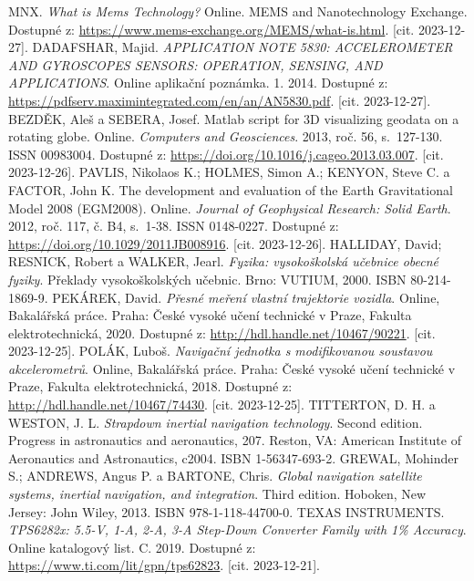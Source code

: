\begin{thebibliography}{22}

MNX. \textit{What is Mems Technology?} Online. MEMS and Nanotechnology Exchange. Dostupné z: \url{https://www.mems-exchange.org/MEMS/what-is.html}. [cit. 2023-12-27].
DADAFSHAR, Majid. \textit{APPLICATION NOTE 5830: ACCELEROMETER AND GYROSCOPES SENSORS: OPERATION, SENSING, AND APPLICATIONS}. Online aplikační poznámka. 1. 2014. Dostupné z: \url{https://pdfserv.maximintegrated.com/en/an/AN5830.pdf}. [cit. 2023-12-27].
BEZDĚK, Aleš a SEBERA, Josef. Matlab script for 3D visualizing geodata on a rotating globe. Online. \textit{Computers and Geosciences}. 2013, roč. 56, s.~127-130. ISSN 00983004. Dostupné z: \url{https://doi.org/10.1016/j.cageo.2013.03.007}. [cit. 2023-12-26].
PAVLIS, Nikolaos K.; HOLMES, Simon A.; KENYON, Steve C. a FACTOR, John K. The development and evaluation of the Earth Gravitational Model 2008 (EGM2008). Online. \textit{Journal of Geophysical Research: Solid Earth}. 2012, roč. 117, č. B4, s.~1-38. ISSN 0148-0227. Dostupné z: \url{https://doi.org/10.1029/2011JB008916}. [cit. 2023-12-26].
HALLIDAY, David; RESNICK, Robert a WALKER, Jearl. \textit{Fyzika: vysokoškolská učebnice obecné fyziky}. Překlady vysokoškolských učebnic. Brno: VUTIUM, 2000. ISBN 80-214-1869-9.
PEKÁREK, David. \textit{Přesné meření vlastní trajektorie vozidla}. Online, Bakalářská práce. Praha: České vysoké učení technické v Praze, Fakulta elektrotechnická, 2020. Dostupné z: \url{http://hdl.handle.net/10467/90221}. [cit. 2023-12-25].
POLÁK, Luboš. \textit{Navigační jednotka s modifikovanou soustavou akcelerometrů}. Online, Bakalářská práce. Praha: České vysoké učení technické v Praze, Fakulta elektrotechnická, 2018. Dostupné z: \url{http://hdl.handle.net/10467/74430}. [cit. 2023-12-25].
TITTERTON, D. H. a WESTON, J. L. \textit{Strapdown inertial navigation technology}. Second edition. Progress in astronautics and aeronautics, 207. Reston, VA: American Institute of Aeronautics and Astronautics, c2004. ISBN 1-56347-693-2.
GREWAL, Mohinder S.; ANDREWS, Angus P. a BARTONE, Chris. \textit{Global navigation satellite systems, inertial navigation, and integration}. Third edition. Hoboken, New Jersey: John Wiley, 2013. ISBN 978-1-118-44700-0.
TEXAS INSTRUMENTS. \textit{TPS6282x: 5.5-V, 1-A, 2-A, 3-A Step-Down Converter Family with 1\% Accuracy}. Online katalogový list. C. 2019. Dostupné z: \url{https://www.ti.com/lit/gpn/tps62823}. [cit. 2023-12-21].

\end{thebibliography}
